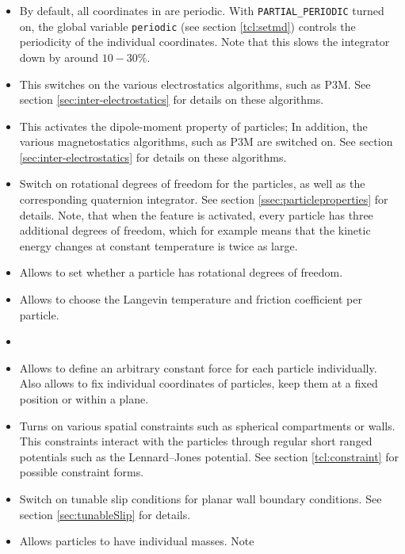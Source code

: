 \begin{itemize}
\item {} By default, all coordinates in \es{}
  are periodic. With \texttt{PARTIAL\_PERIODIC} turned on, the \es{}
  global variable \texttt{periodic} (see section \vref{tcl:setmd})
  controls the periodicity of the individual coordinates. Note that
  this slows the integrator down by around $10-30\%$.
\item {} This switches on the various
  electrostatics algorithms, such as P3M. See section
  \vref{sec:inter-electrostatics} for details on these algorithms.
\item {} This activates the dipole-moment property of
  particles; 
  In addition, the various magnetostatics algorithms, such as P3M are switched on.  See
  section \vref{sec:inter-electrostatics} for details on these
  algorithms.  
\item {} Switch on rotational degrees of freedom
  for the particles, as well as the corresponding quaternion
  integrator.  See section \vref{ssec:particleproperties} for
  details. Note, that when the feature is activated, every particle
  has three additional degrees of freedom, which for example means
  that the kinetic energy changes at constant temperature is twice as
  large.
\item {} Allows to set whether a
  particle has rotational degrees of freedom.
\item {} Allows to choose the
  Langevin temperature and friction coefficient per particle.
\item {}
\item {} Allows to define an arbitrary
  constant force for each particle individually. Also allows to fix
  individual coordinates of particles, \eg keep them at a fixed
  position or within a plane.
\item {} Turns on various spatial constraints such
  as spherical compartments or walls. This constraints interact with
  the particles through regular short ranged potentials such as the
  Lennard--Jones potential. See section \vref{tcl:constraint} for
  possible constraint forms.
\item {} Switch on tunable slip conditions for
  planar wall boundary conditions. See section \vref{sec:tunableSlip}
  for details.
\item {} Allows particles to have individual masses. Note

\end{itemize}
